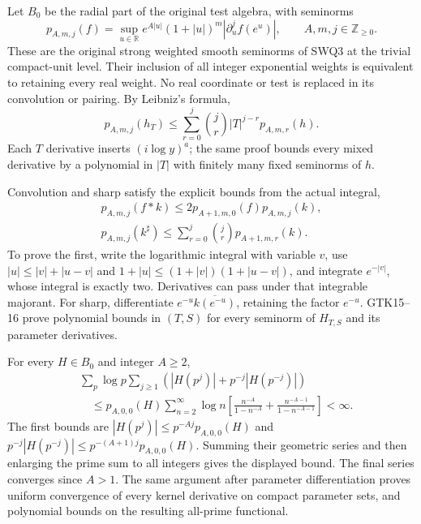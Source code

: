 Let $B_0$ be the radial part of the original test algebra, with
seminorms
\begin{equation}\tag{GTK14}
 p_{A,m,j}(f)=\sup_{u\in\mathbb R}
  e^{A|u|}(1+|u|)^m|\partial_u^jf(e^u)|,
             \qquad A,m,j\in\mathbb Z_{\ge0}.
\end{equation}
These are the original strong weighted smooth seminorms of
SWQ3 at the trivial compact-unit level. Their inclusion of all
integer exponential weights is equivalent to retaining every
real weight. No real coordinate or test is replaced in its
convolution or pairing.
By Leibniz's formula,
\begin{equation}\tag{GTK15}
 p_{A,m,j}(h_T)\le
   \sum_{r=0}^j {j\choose r}|T|^{j-r}p_{A,m,r}(h).
\end{equation}
Each $T$ derivative inserts $(i\log y)^a$; the same proof
bounds every mixed derivative by a polynomial in $|T|$ with
finitely many fixed seminorms of $h$.

Convolution and sharp satisfy the explicit bounds from
the actual integral,
\begin{equation}\tag{GTK16}
 \begin{gathered}
 p_{A,m,j}(f*k)\le
       2p_{A+1,m,0}(f)p_{A,m,j}(k),\\
 p_{A,m,j}(k^\sharp)\le
       \sum_{r=0}^j {j\choose r}p_{A+1,m,r}(k).
 \end{gathered}
\end{equation}
To prove the first, write the logarithmic integral with variable
$v$, use $|u|\le|v|+|u-v|$ and
$1+|u|\le(1+|v|)(1+|u-v|)$, and integrate $e^{-|v|}$,
whose integral is exactly two. Derivatives can pass under that
integrable majorant. For sharp, differentiate
$e^{-u}\overline{k(e^{-u})}$, retaining the factor $e^{-u}$.
GTK15--16 prove polynomial bounds in $(T,S)$ for every
seminorm of $H_{T,S}$ and its parameter derivatives.

For every $H\in B_0$ and integer $A\ge2$,
\begin{equation}\tag{GTK17}
 \begin{split}
 &\sum_p\log p\sum_{j\ge1}
           (|H(p^j)|+p^{-j}|H(p^{-j})|)\\
 &\quad\le
 p_{A,0,0}(H)
 \sum_{n=2}^\infty\log n
       \left[\frac{n^{-A}}{1-n^{-A}}
                  +\frac{n^{-A-1}}{1-n^{-A-1}}\right]<\infty .
 \end{split}
\end{equation}
The first bounds are $|H(p^j)|\le p^{-Aj}p_{A,0,0}(H)$
and $p^{-j}|H(p^{-j})|\le p^{-(A+1)j}p_{A,0,0}(H)$.
Summing their geometric series and then enlarging the prime
sum to all integers gives the displayed bound. The final
series converges since $A>1$. The same argument after
parameter differentiation proves uniform convergence of every
kernel derivative on compact parameter sets, and polynomial
bounds on the resulting all-prime functional.

